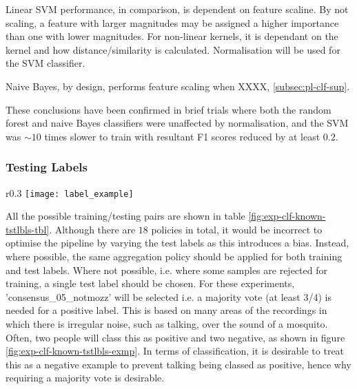             Linear SVM performance, in comparison, is dependent on feature scaline. By not scaling, a feature with larger magnitudes may be assigned a higher importance than one with lower magnitudes. For non-linear kernels, it is dependant on the kernel and how distance/similarity is calculated. Normalisation will be used for the SVM classifier.
            
            Naive Bayes, by design, performs feature scaling when XXXX, \ref{subsec:pl-clf-sup}. 
            
            These conclusions have been confirmed in brief trials where both the random forest and naive Bayes classifiers were unaffected by normalisation, and the SVM was $\sim10$ times slower to train with resultant F1 scores reduced by at least $0.2$.
    
        \subsubsection{Testing Labels}
        \label{subsubsec:exp-clf-known-tstlbls}
            \begin{wrapfigure}{r}{0.3\textwidth}
                \centering
                \texttt{[image: label\_example]}
                \caption{An example of talking where there is disagreement between people.}
                \label{fig:exp-clf-known-tstlbls-exmp}
            \end{wrapfigure}
            All the possible training/testing pairs are shown in table \ref{fig:exp-clf-known-tstlbls-tbl}. Although there are $18$ policies in total, it would be incorrect to optimise the pipeline by varying the test labels as this introduces a bias. Instead, where possible, the same aggregation policy should be applied for both training and test labels. Where not possible, i.e. where some samples are rejected for training, a single test label should be chosen. For these experiments, 'consensus\_05\_notmozz' will be selected i.e. a majority vote (at least 3/4) is needed for a positive label. This is based on many areas of the recordings in which there is irregular noise, such as talking, over the sound of a mosquito. Often, two people will class this as positive and two negative, as shown in figure \ref{fig:exp-clf-known-tstlbls-exmp}. In terms of classification, it is desirable to treat this as a negative example to prevent talking being classed as positive, hence why requiring a majority vote is desirable.
            
